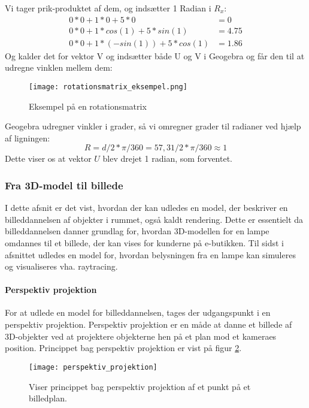 Vi tager prik-produktet af dem, og indsætter 1 Radian i $R_x$:
\begin{equation}
	\begin{align}
		0*0+1*0+5*0&=0\\
		0*0+1*cos(1)+5*sin(1)&=4.75\\
		0*0+1*(-sin(1))+5*cos(1)&=1.86
	\end{align}
\end{equation}
Og kalder det for vektor V og indsætter både U og V i Geogebra og får den til at udregne vinklen mellem dem:
\begin{figure}
	\center\texttt{[image: rotationsmatrix\_eksempel.png]}
	\center\caption{Eksempel på en rotationsmatrix}
  \label{fig:rotationsmatrix_eksempel}
\end{figure}
Geogebra udregner vinkler i grader, så vi omregner grader til radianer ved hjælp af ligningen:
\begin{equation}
	R=d/2*\pi/360=57,31/2*\pi/360\approx1
\end{equation}
Dette viser os at vektor $U$ blev drejet 1 radian, som forventet.

\subsubsection{Fra 3D-model til billede}
I dette afsnit er det vist, hvordan der kan udledes en model, der beskriver en billeddannelsen af objekter i rummet, også kaldt rendering. Dette er essentielt da billeddannelsen danner grundlag for, hvordan 3D-modellen for en lampe omdannes til et billede, der kan vises for kunderne på e-butikken. Til sidst i afsnittet udledes en model for, hvordan belysningen fra en lampe kan simuleres og visualiseres vha. raytracing. 

\paragraph{Perspektiv projektion}
For at udlede en model for billeddannelsen, tages der udgangspunkt i en perspektiv projektion. Perspektiv projektion er en måde at danne et billede af 3D-objekter ved at projektere objekterne hen på et plan mod et kameraes position\cite{fig:perspective_projection}. Princippet bag perspektiv projektion er vist på figur \ref{fig:perspektiv_projektion}.

\begin{figure}[H]
  \label{fig:perspektiv_projektion}
  \centering
  \texttt{[image: perspektiv\_projektion]}
  \caption{Viser princippet bag perspektiv projektion af et punkt på et billedplan.}
\end{figure}

